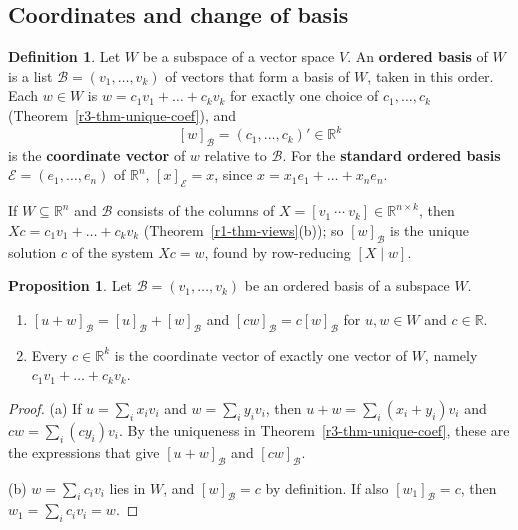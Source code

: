 \documentclass[12pt]{article}
\newcommand{\R}{\mathbb R}
\theoremstyle{definition}
\newtheorem{proposition}[theorem]{Proposition}
\newtheorem{definition}[theorem]{Definition}
\begin{document}
\subsection*{Coordinates and change of basis}

\begin{definition}\label{r3-def-coordinates}
Let \(W\) be a subspace of a vector space \(V\). An \textbf{ordered basis} of \(W\) is a list
\(\mathcal B=(v_1,\dots,v_k)\) of vectors that form a basis of \(W\), taken in this order. Each
\(w\in W\) is \(w=c_1v_1+\dots+c_kv_k\) for exactly one choice of \(c_1,\dots,c_k\)
(Theorem~\ref{r3-thm-unique-coef}), and
\[
[w]_{\mathcal B}=(c_1,\dots,c_k)'\in\R^k
\]
is the \textbf{coordinate vector} of \(w\) relative to \(\mathcal B\). For the \textbf{standard ordered
basis} \(\mathcal E=(e_1,\dots,e_n)\) of \(\R^n\), \([x]_{\mathcal E}=x\), since
\(x=x_1e_1+\dots+x_ne_n\).
\end{definition}
If \(W\subseteq\R^n\) and \(\mathcal B\) consists of the columns of \(X=[v_1\ \cdots\ v_k]\in\R^{n\times k}\),
then \(Xc=c_1v_1+\dots+c_kv_k\) (Theorem~\ref{r1-thm-views}(b)); so \([w]_{\mathcal B}\) is the unique
solution \(c\) of the system \(Xc=w\), found by row-reducing \([X\mid w]\).

\begin{proposition}\label{r3-prop-coordinates}
Let \(\mathcal B=(v_1,\dots,v_k)\) be an ordered basis of a subspace \(W\).
\begin{enumerate}
\item \([u+w]_{\mathcal B}=[u]_{\mathcal B}+[w]_{\mathcal B}\) and \([cw]_{\mathcal B}=c[w]_{\mathcal B}\)
for \(u,w\in W\) and \(c\in\R\).
\item Every \(c\in\R^k\) is the coordinate vector of exactly one vector of \(W\), namely
\(c_1v_1+\dots+c_kv_k\).
\end{enumerate}
\end{proposition}
\begin{proof}
(a) If \(u=\sum_ix_iv_i\) and \(w=\sum_iy_iv_i\), then \(u+w=\sum_i(x_i+y_i)v_i\) and
\(cw=\sum_i(cy_i)v_i\). By the uniqueness in Theorem~\ref{r3-thm-unique-coef}, these are the
expressions that give \([u+w]_{\mathcal B}\) and \([cw]_{\mathcal B}\).

(b) \(w=\sum_ic_iv_i\) lies in \(W\), and \([w]_{\mathcal B}=c\) by definition. If also
\([w_1]_{\mathcal B}=c\), then \(w_1=\sum_ic_iv_i=w\).
\end{proof}
\end{document}
